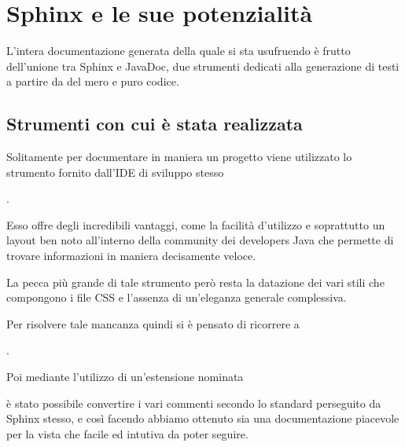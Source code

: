 \documentclass[letterpaper,10pt,italian]{sphinxmanual}
\begin{document}
\chapter{Sphinx e le sue potenzialità}
\label{\detokenize{sphinx:sphinx-e-le-sue-potenzialita}}\label{\detokenize{sphinx::doc}}
L’intera documentazione generata della quale si sta usufruendo è frutto dell’unione tra Sphinx e JavaDoc, due strumenti
dedicati alla generazione di testi a partire da del mero e puro codice.


\section{Strumenti con cui è stata realizzata}
\label{\detokenize{sphinx:strumenti-con-cui-e-stata-realizzata}}
Solitamente per documentare in maniera  un progetto  viene utilizzato
lo strumento fornito dall’IDE di sviluppo stesso  %
\begin{footnote}[1]\sphinxAtStartFootnote
{}
%
\end{footnote}.

Esso offre degli incredibili vantaggi, come la facilità d’utilizzo e soprattutto un
layout ben noto all’interno della community dei developers Java che permette
di trovare informazioni in maniera decisamente veloce.

La pecca più grande di tale strumento però resta la datazione dei vari stili che compongono
i file CSS e l’assenza di un’eleganza generale complessiva.

Per risolvere tale mancanza quindi si è pensato di ricorrere a  %
\begin{footnote}[2]\sphinxAtStartFootnote
{}
%
\end{footnote}.

Poi mediante l’utilizzo di un’estensione nominata  %
\begin{footnote}[3]\sphinxAtStartFootnote
{}
%
\end{footnote} è stato possibile
convertire i vari commenti  secondo lo standard perseguito da Sphinx stesso, e così
facendo abbiamo ottenuto sia una documentazione piacevole per la vista che
facile ed intutiva da poter seguire.
\end{document}
